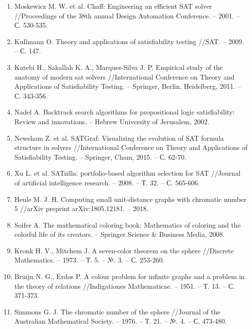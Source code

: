 \begin{enumerate}
\item\label{bib:Moskewicz}
Moskewicz M. W. et al. Chaff: Engineering an efficient SAT solver //Proceedings of the 38th annual Design Automation Conference. – 2001. – С. 530-535.

\item\label{bib:Kullmann2009}
Kullmann O. Theory and applications of satisfiability testing //SAT. – 2009. – С. 147.

\item\label{bib:Katebi}
Katebi H., Sakallah K. A., Marques-Silva J. P. Empirical study of the anatomy of modern sat solvers //International Conference on Theory and Applications of Satisfiability Testing. – Springer, Berlin, Heidelberg, 2011. – С. 343-356.

\item\label{bib:Nadel2002}
Nadel A. Backtrack search algorithms for propositional logic satisfiability: Review and innovations. – Hebrew University of Jerusalem, 2002.

\item\label{bib:Newsham}
Newsham Z. et al. SATGraf: Visualizing the evolution of SAT formula structure in solvers //International Conference on Theory and Applications of Satisfiability Testing. – Springer, Cham, 2015. – С. 62-70.

\item\label{bib:SATzilla}
Xu L. et al. SATzilla: portfolio-based algorithm selection for SAT //Journal of artificial intelligence research. – 2008. – Т. 32. – С. 565-606.

\item\label{bib:Heule2018}
Heule M. J. H. Computing small unit-distance graphs with chromatic number 5 //arXiv preprint arXiv:1805.12181. – 2018.

\item\label{bib:Soifer}
Soifer A. The mathematical coloring book: Mathematics of coloring and the colorful life of its creators. – Springer Science \& Business Media, 2008.

\item\label{bib:Kronk}
Kronk H. V., Mitchem J. A seven-color theorem on the sphere //Discrete Mathematics. – 1973. – Т. 5. – №. 3. – С. 253-260.

\item\label{bib:BruijnErdos}
Bruijn N. G., Erdos P. A colour problem for infinite graphs and a problem in the theory of relations //Indigationes Mathematicae. – 1951. – Т. 13. – С. 371-373.

\item\label{bib:Simmons}
Simmons G. J. The chromatic number of the sphere //Journal of the Australian Mathematical Society. – 1976. – Т. 21. – №. 4. – С. 473-480.


\end{enumerate}
